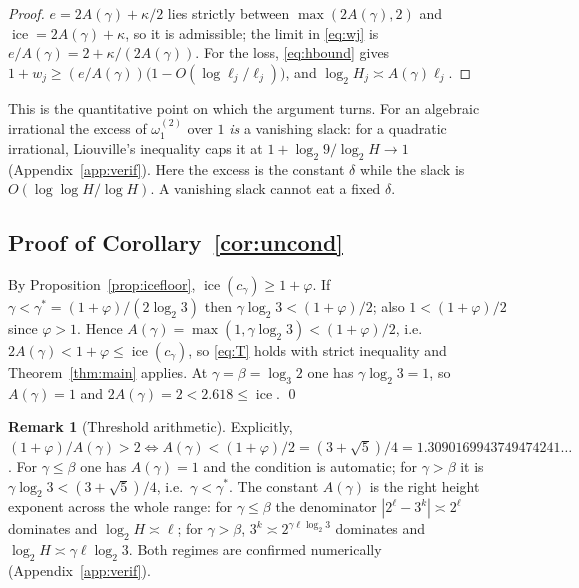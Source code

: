 \documentclass[11pt,reqno]{amsart}
\theoremstyle{plain}
\theoremstyle{definition}
\newtheorem{remark}[theorem]{Remark}
\DeclareMathOperator{\ice}{ice}
\newcommand{\gs}{\gamma^{*}}
\newcommand{\Av}{A(\gamma)}
\newcommand{\om}{\omega_1^{(2)}}
\begin{document}
\begin{proof}
$e=2\Av+\kappa/2$ lies strictly between $\max(2\Av,2)$ and $\ice=2\Av+\kappa$, so it is admissible;
the limit in \eqref{eq:wj} is $e/\Av=2+\kappa/(2\Av)$. For the loss, \eqref{eq:hbound} gives
$1+w_j\ge(e/\Av)\bigl(1-O(\log\ell_j/\ell_j)\bigr)$, and $\log_2 H_j\asymp\Av\ell_j$.
\end{proof}

This is the quantitative point on which the argument turns. For an algebraic irrational the excess
of $\om$ over $1$ \emph{is} a vanishing slack: for a quadratic irrational, Liouville's inequality
caps it at $1+\log_2 9/\log_2 H\to1$ (Appendix~\ref{app:verif}). Here the excess is the constant
$\delta$ while the slack is $O(\log\log H/\log H)$. A vanishing slack cannot eat a fixed $\delta$.

\subsection{Proof of Corollary~\ref{cor:uncond}}
By Proposition~\ref{prop:icefloor}, $\ice(c_\gamma)\ge1+\varphi$. If $\gamma<\gs=(1+\varphi)/(2\log_2 3)$
then $\gamma\log_2 3<(1+\varphi)/2$; also $1<(1+\varphi)/2$ since $\varphi>1$. Hence
$\Av=\max(1,\gamma\log_2 3)<(1+\varphi)/2$, i.e.\ $2\Av<1+\varphi\le\ice(c_\gamma)$, so \eqref{eq:T}
holds with strict inequality and Theorem~\ref{thm:main} applies. At $\gamma=\beta=\log_3 2$ one has
$\gamma\log_2 3=1$, so $\Av=1$ and $2\Av=2<2.618\le\ice$. \qed

\begin{remark}[Threshold arithmetic]\label{rem:threshold}
Explicitly, $(1+\varphi)/\Av>2\iff\Av<(1+\varphi)/2=(3+\sqrt5)/4=1.3090169943749474241\ldots$. For
$\gamma\le\beta$ one has $\Av=1$ and the condition is automatic; for $\gamma>\beta$ it is
$\gamma\log_2 3<(3+\sqrt5)/4$, i.e.\ $\gamma<\gs$. The constant $\Av$ is the right height exponent
across the whole range: for $\gamma\le\beta$ the denominator $|2^{\ell}-3^{k}|\asymp2^{\ell}$
dominates and $\log_2 H\asymp\ell$; for $\gamma>\beta$, $3^{k}\asymp2^{\gamma\ell\log_2 3}$ dominates
and $\log_2 H\asymp\gamma\ell\log_2 3$. Both regimes are confirmed numerically
(Appendix~\ref{app:verif}).
\end{remark}
\end{document}
